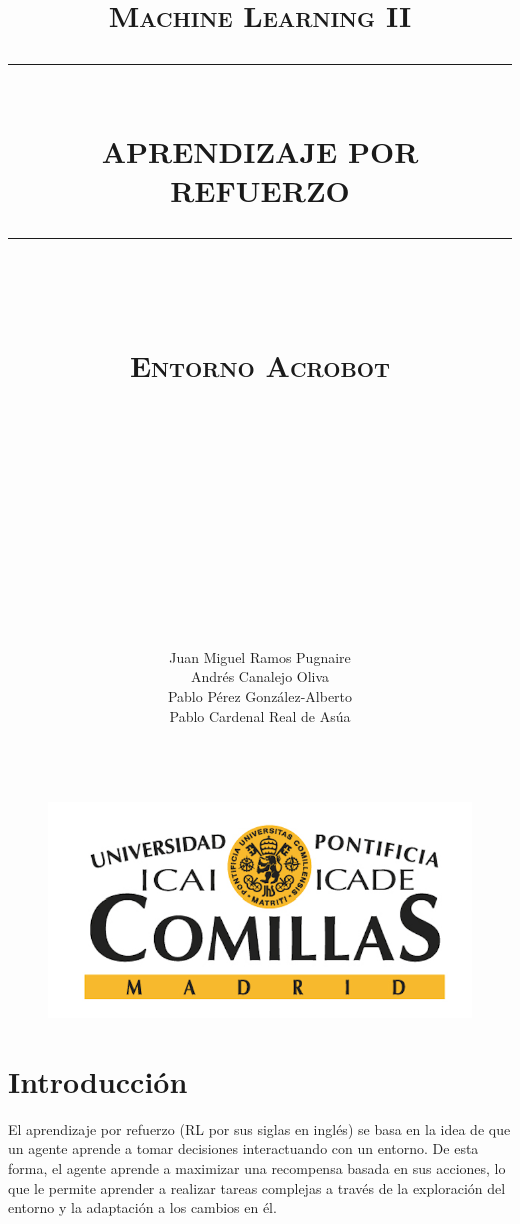 \documentclass[12pt]{article}
\renewcommand{\contentsname}{Índice}
\newcommand{\HRule}[1]{\rule{\linewidth}{#1}}
\begin{document}
	\title{ \large \textsc{\\[-2cm]Machine Learning II\\[0.5cm ]}
		\HRule{1pt} \\
		\LARGE \textbf{\uppercase{Aprendizaje por refuerzo}}\\
		[-0.5cm]\HRule{1pt} \\ 
		\large \textsc{\\Entorno Acrobot}
	}
	\author{\phantom{aaaaa}\\
		\phantom{aaa} \\
		\phantom{aaa} \\
		\phantom{aaa} \\
		\phantom{aaa} \\
		\phantom{aaa} \\
		\phantom{aaa} \\
		\phantom{aaa} \\
		\phantom{aaa} \\
		\phantom{aaa} \\
		\phantom{aaa} \\
		\phantom{aaa} \\
		Juan Miguel Ramos Pugnaire\\
		Andrés Canalejo Oliva\\
		Pablo Pérez González-Alberto\\
		Pablo Cardenal Real de Asúa
	}
	\newpage
	\begin{figure}[t!]
		\centering
		\phantom{aaaaa}\\[-3cm]
		\includegraphics[width=0.4\linewidth]{Imagenes/logo.png}
	\end{figure}
	
	
	\maketitle
	
	\pdfbookmark[section]{\contentsname}{}
	\tableofcontents
	\newpage
	
	
	\section{Introducción}
	
	El aprendizaje por refuerzo (RL por sus siglas en inglés) se basa en la idea de que un agente aprende a tomar decisiones interactuando con un entorno. De esta forma, el agente aprende a maximizar una recompensa basada en sus acciones, lo que le permite aprender a realizar tareas complejas a través de la exploración del entorno y la adaptación a los cambios en él.
	
\end{document}
